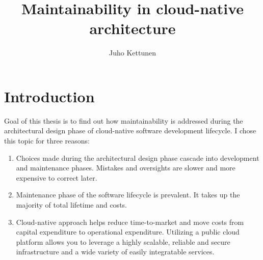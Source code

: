 \documentclass[utf8,english]{gradu3}
\begin{document}
\title{Maintainability in cloud-native architecture}

\author{Juho Kettunen}

\maketitle

\mainmatter

\chapter{Introduction}

Goal of this thesis is to find out how maintainability is addressed during the
architectural design phase of cloud-native software development lifecycle.
I chose this topic for three reasons:
\begin{enumerate}
  \item Choices made during the architectural design phase cascade into
        development and maintenance phases. Mistakes and oversights are
        slower and more expensive to correct later.
  \item Maintenance phase of the software lifecycle is prevalent.
        It takes up the majority of total lifetime and costs.
  \item Cloud-native approach helps reduce time-to-market and move costs from
        capital expenditure to operational expenditure. Utilizing a public cloud
        platform allows you to leverage a highly scalable, reliable and secure
        infrastructure and a wide variety of easily integratable services.
\end{enumerate}


\end{document}
